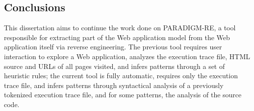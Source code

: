 \documentclass[9pt,a4paper]{extarticle}
\begin{document}
\begin{multicols}{2}
\section{Conclusions}\label{sec:conclusion}
This dissertation aims to continue the work done on PARADIGM-RE, a tool responsible for extracting part of the Web application model from the Web application itself via reverse engineering.
The previous tool requires user interaction to explore a Web application, analyzes the execution trace file, HTML source and URLs  of all pages visited, and infers patterns through a set of heuristic rules; the current tool is fully automatic, requires only the execution trace file, and infers patterns through syntactical analysis of a previously tokenized execution trace file, and for some patterns, the analysis of the source code.



\end{multicols}
\end{document}
